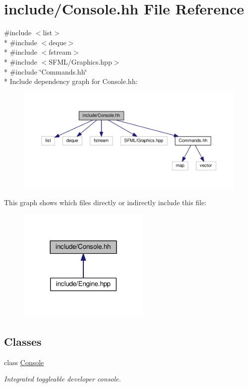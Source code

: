 \hypertarget{Console_8hh}{}\section{include/\+Console.hh File Reference}
\label{Console_8hh}
{\ttfamily \#include $<$list$>$}\\*
{\ttfamily \#include $<$deque$>$}\\*
{\ttfamily \#include $<$fstream$>$}\\*
{\ttfamily \#include $<$S\+F\+M\+L/\+Graphics.\+hpp$>$}\\*
{\ttfamily \#include \char`\"{}Commands.\+hh\char`\"{}}\\*
Include dependency graph for Console.\+hh\+:
\nopagebreak
\begin{figure}[H]
\begin{center}
\leavevmode
\includegraphics[width=350pt]{Console_8hh__incl}
\end{center}
\end{figure}
This graph shows which files directly or indirectly include this file\+:
\nopagebreak
\begin{figure}[H]
\begin{center}
\leavevmode
\includegraphics[width=180pt]{Console_8hh__dep__incl}
\end{center}
\end{figure}
\subsection*{Classes}
\begin{DoxyCompactItemize}
\item 
class \hyperlink{classConsole}{Console}
\begin{DoxyCompactList}\small\item\em Integrated toggleable developer console. \end{DoxyCompactList}\end{DoxyCompactItemize}
